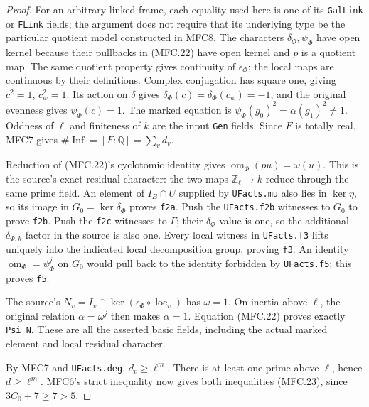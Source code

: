 \begin{proof}
For an arbitrary linked frame, each equality used here is one
of its \texttt{GalLink} or \texttt{FLink} fields; the argument
does not require that its underlying type be the particular
quotient model constructed in MFC8.
The characters \(\delta_\Phi,\psi_\Phi\) have open kernel
because their pullbacks in (MFC.22) have open kernel and \(p\)
is a quotient map.  The same quotient property gives continuity
of \(\epsilon_\Phi\); the local maps are continuous by their
definitions.  Complex conjugation has square one, giving
\(c^2=1\), \(c_w^2=1\).  Its action on \(\delta\) gives
\(\delta_\Phi(c)=\delta_\Phi(c_w)=-1\), and the original
evenness gives \(\psi_\Phi(c)=1\).  The marked equation is
\(\psi_\Phi(g_0)^2=\alpha(g_1)^2\ne1\).
Oddness of \(\ell\) and finiteness of \(k\) are the input
\texttt{Gen} fields.  Since \(F\) is totally real, MFC7 gives
\(\#\operatorname{Inf}=[F:\mathbb Q]=\sum_vd_v\).

Reduction of (MFC.22)'s cyclotomic identity gives
\(\operatorname{om}_\Phi(pu)=\omega(u)\).  This is the
source's exact residual character: the two maps
\(\mathbb Z_\ell\to k\) reduce through the same prime field.
An element of \(I_B\cap U\) supplied by \texttt{UFacts.mu}
also lies in \(\ker\eta\), so its image in
\(G_0=\ker\delta_\Phi\) proves \texttt{f2a}.
Push the \texttt{UFacts.f2b} witnesses to \(G_0\) to prove
\texttt{f2b}.  Push the \texttt{f2c} witnesses to \(\Gamma\);
their \(\delta_\Phi\)-value is one, so the additional
\(\delta_{\Phi,k}\) factor in the source is also one.
Every local witness in \texttt{UFacts.f3} lifts uniquely into
the indicated local decomposition group, proving \texttt{f3}.
An identity \(\operatorname{om}_\Phi=\psi_\Phi^j\) on
\(G_0\) would pull back to the identity forbidden by
\texttt{UFacts.f5}; this proves \texttt{f5}.

The source's
\(N_v=I_v\cap\ker(\epsilon_\Phi\circ\operatorname{loc}_v)\)
has \(\omega=1\).  On inertia above \(\ell\), the original
relation \(\alpha=\omega^j\) then makes \(\alpha=1\).
Equation (MFC.22) proves exactly \texttt{Psi\_N}.
These are all the asserted basic fields, including the actual
marked element and local residual character.

By MFC7 and \texttt{UFacts.deg}, \(d_v\ge\ell^m\).
There is at least one prime above \(\ell\), hence
\(d\ge\ell^m\).  MFC6's strict inequality now gives both
inequalities (MFC.23), since \(3C_0+7\ge7>5\).
\end{proof}

